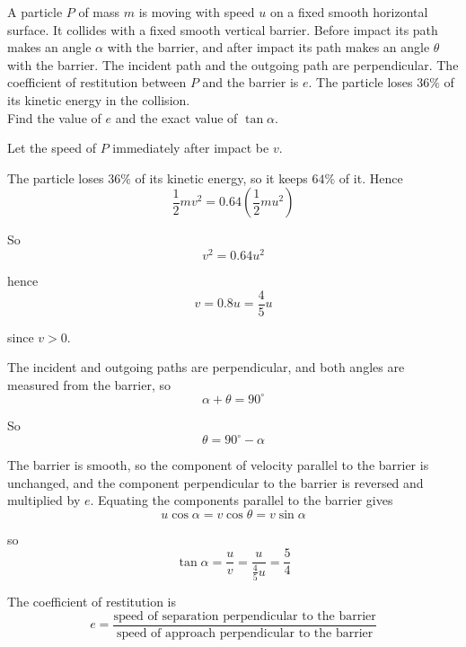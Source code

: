 \documentclass[leqno]{article}
\begin{document}
\begin{enumerate}[
  label=\textbf{\arabic*.},
  leftmargin=*,
  topsep=0pt,
  partopsep=0pt,
  parsep=0pt
]
\begin{figure}[H]
\end{figure}


A particle $P$ of mass $m$ is moving with speed $u$ on a fixed smooth horizontal surface. It collides with a fixed smooth vertical barrier. Before impact its path makes an angle $\alpha$ with the barrier, and after impact its path makes an angle $\theta$ with the barrier. The incident path and the outgoing path are perpendicular. The coefficient of restitution between $P$ and the barrier is $e$. The particle loses $36\%$ of its kinetic energy in the collision. \\

Find the value of $e$ and the exact value of $\tan \alpha$. 

\vspace*{10pt}

\begin{djsSolution}
Let the speed of \(P\) immediately after impact be \(v\).

The particle loses \(36\%\) of its kinetic energy, so it keeps \(64\%\) of it. Hence
\[
\frac12 mv^2=0.64\left(\frac12 mu^2\right)
\]

So
\[
v^2=0.64u^2
\]

hence
\[
v=0.8u=\frac45u
\]

since \(v>0\).

The incident and outgoing paths are perpendicular, and both angles are measured from the barrier, so
\[
\alpha+\theta=90^\circ
\]

So
\[
\theta=90^\circ-\alpha
\]

The barrier is smooth, so the component of velocity parallel to the barrier is unchanged, and the component perpendicular to the barrier is reversed and multiplied by \(e\). Equating the components parallel to the barrier gives
\[
u\cos\alpha=v\cos\theta =v\sin\alpha
\]

so
\[
\tan\alpha=\frac{u}{v}=\frac{u}{\frac45u}=\frac54
\]

The coefficient of restitution is
\[
e=\dfrac{\text{speed of separation perpendicular to the barrier}}{\text{speed of approach perpendicular to the barrier}}
\]


\end{djsSolution}
\end{enumerate}
\end{document}

